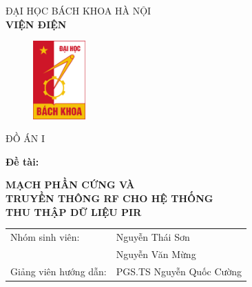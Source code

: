 \documentclass{article}
\begin{document}
\begin{titlepage}

\begin{center}
    \vspace{-10pt} ĐẠI HỌC BÁCH KHOA HÀ NỘI\\
    \textbf{\fontsize{16pt}{0pt}\selectfont VIỆN ĐIỆN}
    \vspace{0.5cm}
    \begin{figure}[H]
        \centering
        \includegraphics[width=2cm,height=3cm]{image/logo.png}
    \end{figure}


    \vspace{1cm}
    \fontsize{24pt}{0pt}\selectfont ĐỒ ÁN I\\
\end{center}
\hspace{15pt} \textbf{\fontsize{14pt}{0pt}\selectfont Đề tài:\\}
\begin{center}
    \textbf{\fontsize{20pt}{0pt}\selectfont MẠCH PHẦN CỨNG VÀ\\}
    \textbf{\fontsize{20pt}{0pt}\selectfont TRUYỀN THÔNG RF CHO HỆ THỐNG \\}
    \textbf{\fontsize{20pt}{0pt}\selectfont THU THẬP DỮ LIỆU PIR \\}
\end{center}
\vspace{1cm}
\begin{tabular}{l l}
    \hspace{15pt}
    \fontsize{14pt}{0pt}\selectfont Nhóm sinh viên: & \fontsize{20pt}{0pt}\selectfont Nguyễn Thái Sơn \\
    &\fontsize{20pt}{0pt}\selectfont Nguyễn Văn Mừng\\
    \hspace{15pt}
    \fontsize{14pt}{0pt}\selectfont Giảng viên hướng dẫn: & \fontsize{20pt}{0pt}\selectfont PGS.TS Nguyễn Quốc Cường  \\
   


\end{tabular}
\end{titlepage}
\end{document}
